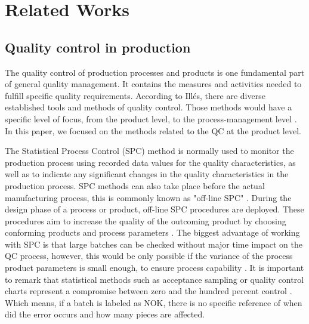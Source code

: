 \documentclass[5p,times,procedia]{elsarticle}
\begin{document}
\section{Related Works} %

\subsection{Quality control in production} \label{sec:qcp} %

The quality control of production processes and products is one fundamental part of general quality management. It contains the measures and activities needed to fulfill specific quality requirements.
According to Illés, there are diverse established tools and methods of quality control. Those methods would have a specific level of focus, from the product level, to the process-management level \cite{illes2017new}. In this paper, we focused on the methods related to the QC at the product level.

The Statistical Process Control (SPC) method is normally used to monitor the production process using recorded data values for the quality characteristics, as well as to indicate any significant changes in the quality characteristics in the production process. SPC methods can also take place before the actual manufacturing process, this is commonly known as "off-line SPC" \cite{selvamuthu2018introduction}. 
During the design phase of a process or product, off-line SPC procedures are deployed. These procedures aim to increase the quality of the outcoming product by choosing conforming products and  process parameters \cite{mitra2016fundamentals}.
The biggest advantage of working with SPC is that large batches can be checked without major time impact on the QC process, however, this would be only possible if the variance of the process product parameters is small enough, to ensure process capability \cite{kahle2013zuverlaessigkeitsanalyse}.
It is important to remark that statistical methods such as acceptance sampling or quality control charts represent a compromise between zero and the hundred percent control \cite{selvamuthu2018introduction, kurniati2015quality}. Which means, if a batch is labeled as NOK, there is no specific reference of when did the error occurs and how many pieces are affected.
\end{document}
